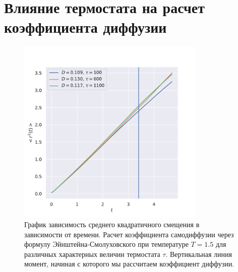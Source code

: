 \documentclass[a4paper,12pt]{article}
\begin{document}
\section{Влияние термостата на расчет коэффициента диффузии}

\begin{figure}[H]
    \centering
    \includegraphics[width=0.8\textwidth]{../../media/thermostat.pdf}
\caption{График зависимость среднего квадратичного
смещения в зависимости от времени. Расчет коэффициента
самодиффузии через формулу Эйнштейна-Смолуховского при
температуре \(T = 1.5\) для различных характерных 
величин термостата \(\tau\).
Вертикальная линия момент, начиная с которого 
мы рассчитаем коэффициент диффузии.}
\end{figure}
\end{document}
